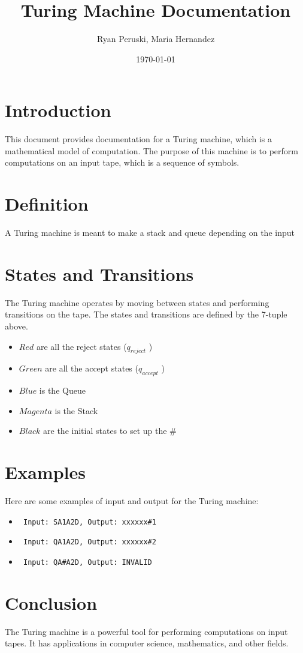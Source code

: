 \documentclass{article}
\title{Turing Machine Documentation}
\author{Ryan Peruski, Maria Hernandez}
\date{\today}
\begin{document}
\maketitle

\section{Introduction}
This document provides documentation for a Turing machine, which is a mathematical model of computation. The purpose of this machine is to perform computations on an input tape, which is a sequence of symbols.

\section{Definition}
A Turing machine is meant to make a stack and queue depending on the input

\section{States and Transitions}
The Turing machine operates by moving between states and performing transitions on the tape. The states and transitions are defined by the 7-tuple above.

\begin{itemize}
    \item $Red$ are all the reject states ($q_{reject}$ )
    \item $Green$ are all the accept states ($q_{accept}$ )
    \item $Blue$ is the Queue
    \item $Magenta$ is the Stack
    \item $Black$ are the initial states to set up the $\#$
\end{itemize}

\section{Examples}
Here are some examples of input and output for the Turing machine:
\begin{itemize}
    \item \begin{verbatim} Input: SA1A2D, Output: xxxxxx#1 \end{verbatim}
    \item \begin{verbatim} Input: QA1A2D, Output: xxxxxx#2 \end{verbatim}
    \item \begin{verbatim} Input: QA#A2D, Output: INVALID \end{verbatim}
\end{itemize}

\section{Conclusion}
The Turing machine is a powerful tool for performing computations on input tapes. It has applications in computer science, mathematics, and other fields.
\end{document}
